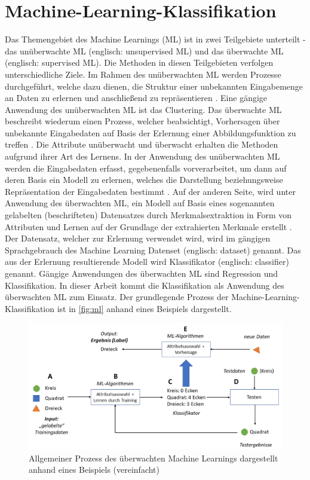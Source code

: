 \section{Machine-Learning-Klassifikation}
\label{classification}

Das Themengebiet des Machine Learnings (ML) ist in zwei Teilgebiete unterteilt - das unüberwachte ML (englisch: unsupervised ML) und das überwachte ML (englisch: supervised ML). Die Methoden in diesen Teilgebieten verfolgen unterschiedliche Ziele. Im Rahmen des unüberwachten ML werden Prozesse durchgeführt, welche dazu dienen, die Struktur einer unbekannten Eingabemenge an Daten zu erlernen und anschließend zu repräsentieren \cite{Sammut2017}. Eine gängige Anwendung des unüberwachten ML ist das Clustering. Das überwachte ML beschreibt wiederum einen Prozess, welcher beabsichtigt, Vorhersagen über unbekannte Eingabedaten auf Basis der Erlernung einer Abbildungsfunktion zu treffen \cite{Sammut2017}. Die Attribute \glqq unüberwacht\grqq{} und \glqq überwacht\grqq{} erhalten die Methoden aufgrund ihrer Art des Lernens. In der Anwendung des unüberwachten ML werden die Eingabedaten erfasst, gegebenenfalls vorverarbeitet, um dann auf deren Basis ein Modell zu erlernen, welches die Darstellung beziehungsweise Repräsentation der Eingabedaten bestimmt \cite{Alpaydin2010}. Auf der anderen Seite, wird unter Anwendung des überwachten ML, ein Modell auf Basis eines sogenannten \glqq gelabelten\grqq{} (beschrifteten) Datensatzes durch Merkmalsextraktion in Form von Attributen und Lernen auf der Grundlage der extrahierten Merkmale erstellt \cite{Alpaydin2010}. Der Datensatz, welcher zur Erlernung verwendet wird, wird im gängigen Sprachgebrauch des Machine Learning Datenset (englisch: dataset) genannt. Das aus der Erlernung resultierende Modell wird Klassifikator (englisch: classifier) genannt. Gängige Anwendungen des überwachten ML sind Regression und Klassifikation. In dieser Arbeit kommt die Klassifikation als Anwendung des überwachten ML zum Einsatz. Der grundlegende Prozess der Machine-Learning-Klassifikation ist in \autoref{fig:ml} anhand eines Beispiels dargestellt.

\begin{figure}[t]
    \centering
    \captionsetup{justification=centering,margin=2cm}
    \includegraphics[width=\textwidth]{images/ML}
    \caption{Allgemeiner Prozess des überwachten Machine Learnings dargestellt anhand eines Beispiels (vereinfacht)}\label{fig:ml}
\end{figure}

